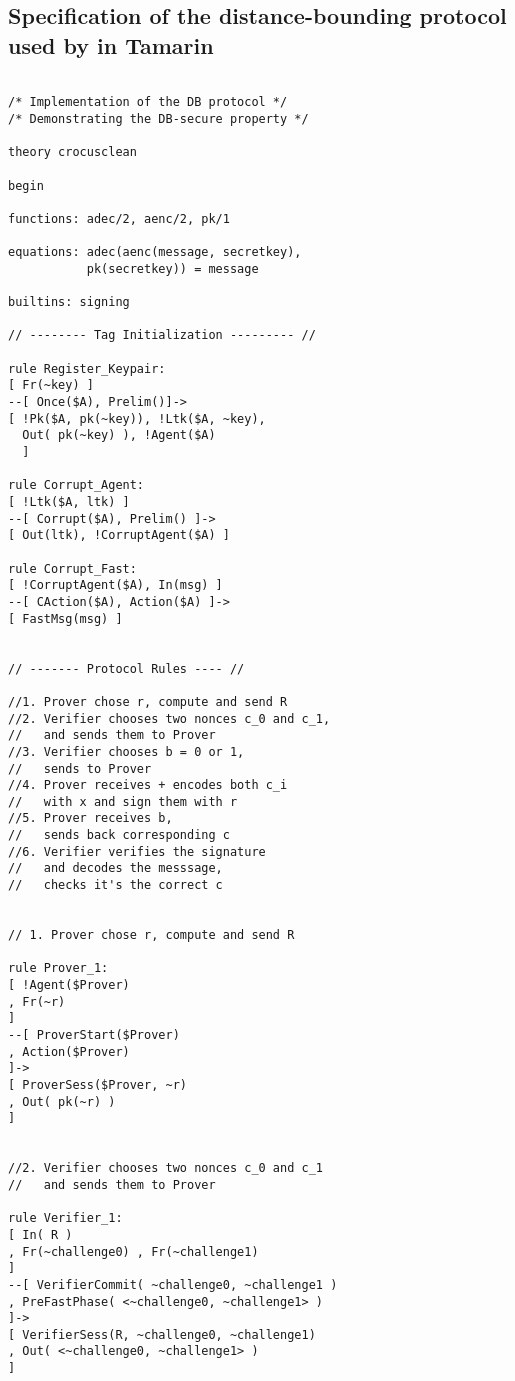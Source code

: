 \subsection{Specification of the distance-bounding protocol used by \PRIVO in Tamarin}
\label{apdx:tamarin-spec}

\begin{lstlisting}

/* Implementation of the DB protocol */
/* Demonstrating the DB-secure property */

theory crocusclean

begin

functions: adec/2, aenc/2, pk/1

equations: adec(aenc(message, secretkey), 
           pk(secretkey)) = message

builtins: signing

// -------- Tag Initialization --------- //

rule Register_Keypair:
[ Fr(~key) ]
--[ Once($A), Prelim()]->
[ !Pk($A, pk(~key)), !Ltk($A, ~key), 
  Out( pk(~key) ), !Agent($A)
  ]

rule Corrupt_Agent:
[ !Ltk($A, ltk) ]
--[ Corrupt($A), Prelim() ]->
[ Out(ltk), !CorruptAgent($A) ]

rule Corrupt_Fast:
[ !CorruptAgent($A), In(msg) ]
--[ CAction($A), Action($A) ]->
[ FastMsg(msg) ]


// ------- Protocol Rules ---- //

//1. Prover chose r, compute and send R
//2. Verifier chooses two nonces c_0 and c_1,
//   and sends them to Prover
//3. Verifier chooses b = 0 or 1, 
//   sends to Prover
//4. Prover receives + encodes both c_i 
//   with x and sign them with r
//5. Prover receives b,
//   sends back corresponding c
//6. Verifier verifies the signature 
//   and decodes the messsage, 
//   checks it's the correct c


// 1. Prover chose r, compute and send R

rule Prover_1:
[ !Agent($Prover) 
, Fr(~r)
]
--[ ProverStart($Prover)
, Action($Prover)
]->
[ ProverSess($Prover, ~r) 
, Out( pk(~r) )
]


//2. Verifier chooses two nonces c_0 and c_1 
//   and sends them to Prover

rule Verifier_1:
[ In( R ) 
, Fr(~challenge0) , Fr(~challenge1)
]
--[ VerifierCommit( ~challenge0, ~challenge1 ) 
, PreFastPhase( <~challenge0, ~challenge1> )
]->
[ VerifierSess(R, ~challenge0, ~challenge1) 
, Out( <~challenge0, ~challenge1> )
]



\end{lstlisting}
